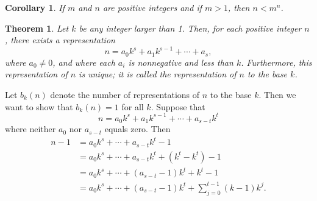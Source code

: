 \documentclass{article}
\makeatletter
\newtheorem{theorem}{\hspace{6.5mm}Theorem}[section]
\newtheorem{corollary}{\hspace{6.5mm}Corollary}[theorem]
\theoremstyle{definition}
\theoremstyle{remark}
\let\oldproofname=\proofname
\renewcommand{\proofname}{\bf{\textit{\oldproofname}}}
\theoremstyle{definition}
\renewenvironment{proof}[1][\proofname]{\par
  \pushQED{\qed}%
  \normalfont \topsep6\p@\@plus6\p@\relax
  \list{}{\leftmargin=0mm
          \rightmargin=0mm
          \settowidth{\itemindent}{\itshape#1}%
          \labelwidth=4mm
          \parsep=0pt \listparindent=0mm%
  }
  \item[\hskip\labelsep
        \itshape
    #1\@addpunct{.}]\ignorespaces
}{%
  \popQED\endlist\@endpefalse
}
\makeatother
\begin{document}
\begin{corollary}\label{cor:1.2.1}
    If $m$ and $n$ are positive integers and if $m>1$, then $n<m^n$.
\end{corollary}

\begin{theorem}\label{thm:1.3}
    Let $k$ be any integer larger than 1. Then, for each positive integer $n$, there exists a representation 
        \begin{equation*}
            n=a_0k^s+a_1k^{s-1}+\cdots+a_s,
        \end{equation*}
    where $a_0\neq 0$, and where each $a_i$ is nonnegative and less than $k$. Furthermore, this representation of $n$ is unique; it is called the representation of $n$ to the base $k$.
\end{theorem}

\begin{proof}
    Let $b_k(n)$ denote the number of representations of $n$ to the base $k$. Then we want to show that $b_k(n)=1$ for all $k$. Suppose that 
        \begin{equation*}
            n=a_0k^s+a_1k^{s-1}+\cdots+ a_{s-t}k^t
        \end{equation*}
    \noindent where neither $a_0$ nor $a_{s-t}$ equals zero. Then 
        \begin{equation*}
            \begin{split}
                n-1&=a_0k^s+\cdots+ a_{s-t}k^t-1 \\
                &= a_0k^s+\cdots+ a_{s-t}k^t+(k^t-k^t)-1 \\
                &= a_0k^s+\cdots+ (a_{s-t}-1)k^t+k^t-1 \\
                &= a_0k^s+\cdots+(a_{s-t}-1)k^t+\sum\limits_{j=0}^{t-1}(k-1)k^j.
            \end{split}
        \end{equation*}
\end{proof}
\end{document}
